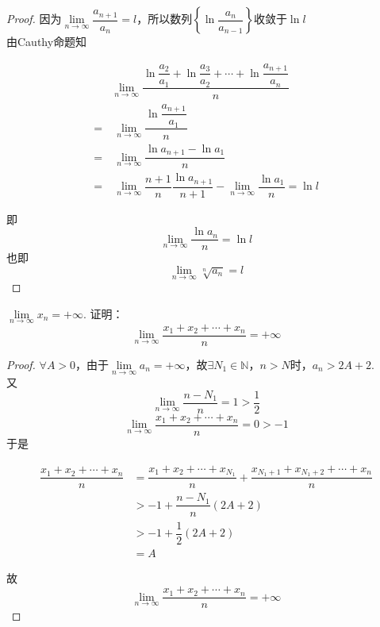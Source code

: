 \begin{proof}

    因为$\lim\limits_{n \to \infty}{\dfrac{a_{n + 1}}{a_n}} = l$，所以数列$\left\{ \ln{\dfrac{a_n}{a_{n - 1}}} \right\}$收敛于$\ln{l}$ \\
    由\textup{Cauthy}命题知
    
    \begin{align*}
        & \lim\limits_{n \to \infty}{\dfrac{\ln{\dfrac{a_2}{a_1}} + \ln{\dfrac{a_3}{a_2}} + \cdots + \ln{\dfrac{a_{n + 1}}{a_n}}}{n}} \\
        = & \ \lim\limits_{n \to \infty}{\dfrac{\ln{\dfrac{a_{n + 1}}{a_1}}}{n}} \\
        = & \ \lim\limits_{n \to \infty}{\dfrac{\ln{a_{n + 1} - \ln{a_1}}}{n}} \\
        = & \ \lim\limits_{n \to \infty}{\dfrac{n + 1}{n}\dfrac{\ln{a_{n + 1}}}{n + 1}} - \lim\limits_{n \to \infty}{\dfrac{\ln{a_1}}{n}} = \ln{l}
    \end{align*}

    即
    \[\lim\limits_{n \to \infty}{\dfrac{\ln{a_n}}{n}} = \ln{l}\]
    也即
    \[\lim\limits_{n \to \infty}{\sqrt[n]{a_n}} = l\]

\end{proof}

\begin{proposition}

    $\lim\limits_{n \to \infty}{x_n} = +\infty$. 证明：
    \[\lim\limits_{n \to \infty}{\dfrac{x_1 + x_2 + \cdots + x_n}{n}} = +\infty\]

\end{proposition}

\begin{proof} 

    $\forall A > 0$，由于$\lim\limits_{n \to \infty}{a_n} = +\infty$，故$\exists N_1 \in \mathbb{N}$，$n > N$时，$a_n > 2A + 2$. \\
    又
    \[\lim\limits_{n \to \infty}{\dfrac{n - N_1}{n}} = 1 > \dfrac{1}{2}\]
    \[\lim\limits_{n \to \infty}{\dfrac{x_1 + x_2 + \cdots + x_n}{n}} = 0 > -1\]
    于是

    \begin{align*}
        \dfrac{x_1 + x_2 + \cdots + x_n}{n} & = \dfrac{x_1 + x_2 + \cdots + x_{N_1}}{n} + \dfrac{x_{N_1 + 1} + x_{N_1 + 2} + \cdots + x_n}{n} \\
        & > -1 + \dfrac{n - N_1}{n}(2A + 2) \\
        & > -1 + \dfrac{1}{2}(2A + 2) \\
        & = A 
    \end{align*}

    故
    \[\lim\limits_{n \to \infty}{\dfrac{x_1 + x_2 + \cdots + x_n}{n}} = +\infty\]
    
\end{proof} 

